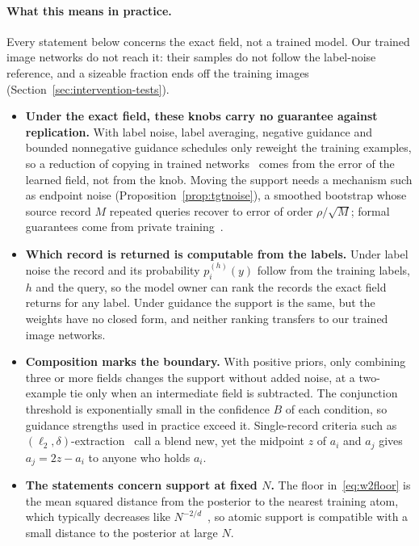 \documentclass{article} %
\theoremstyle{plain}
\theoremstyle{definition}
\theoremstyle{remark}
\begin{document}
\paragraph{What this means in practice.} Every statement below concerns the exact field, not a
trained model. Our trained image networks do not reach it: their samples do not follow the
label-noise reference, and a sizeable fraction ends off the training images
(Section~\ref{sec:intervention-tests}).
\begin{itemize}[leftmargin=1.5em,itemsep=2pt]
\item \textbf{Under the exact field, these knobs carry no guarantee against replication.} With label
  noise, label averaging, negative guidance and bounded nonnegative guidance schedules only reweight
  the training examples, so a reduction of copying in trained networks~\citep{somepalli2023copying}
  comes from the error of the learned field, not from the knob. Moving the support needs a mechanism
  such as endpoint noise (Proposition~\ref{prop:tgtnoise}), a smoothed bootstrap whose source record
  $M$ repeated queries recover to error of order $\rho/\sqrt M$; formal guarantees come from private
  training~\citep{dockhorn2023differentially,dwork2014algorithmic}.
\item \textbf{Which record is returned is computable from the labels.} Under label noise the record
  and its probability $p_i^{(h)}(y)$ follow from the training labels, $h$ and the query, so the model
  owner can rank the records the exact field returns for any label. Under guidance the support is
  the same, but the weights have no closed form, and neither ranking transfers to our trained image
  networks.
\item \textbf{Composition marks the boundary.} With positive priors, only combining three or more
  fields changes the support without added noise, at a two-example tie only when an intermediate
  field is subtracted. The conjunction threshold is exponentially small in the confidence $B$ of each
  condition, so guidance strengths used in practice exceed it. Single-record criteria such as
  $(\ell_2,\delta)$-extraction~\citep{carlini2023extracting} call a blend new, yet the midpoint $z$ of
  $a_i$ and $a_j$ gives $a_j=2z-a_i$ to anyone who holds $a_i$.
\item \textbf{The statements concern support at fixed $N$.} The floor in~\eqref{eq:w2floor} is the
  mean squared distance from the posterior to the nearest training atom, which typically decreases
  like $N^{-2/d}$~\citep{graf2000quantization}, so atomic support is compatible with a small
  distance to the posterior at large $N$.
\end{itemize}
\end{document}
